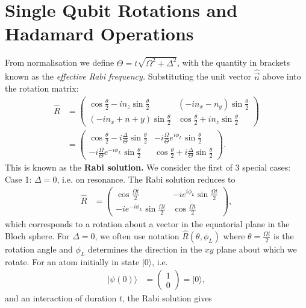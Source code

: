 \documentclass[a4paper, 11pt, normalem]{report}
\begin{document}
\chapter{Single Qubit Rotations and Hadamard Operations}
From normalisation we define $\Theta=t\sqrt{\Omega^2+\Delta^2}$, with the quantity in brackets known as the \emph{effective Rabi frequency.}
Substituting the unit vector $\hat{\vec{n}}$ above into the rotation matrix:
\begin{align}
    \hat{R} &= \begin{pmatrix} \cos\frac{\theta}{2}-in_z\sin\frac{\theta}{2} & (-in_x-n_y)\sin\frac{\theta}{2} \\ (-in_x+n+y)\sin\frac{\theta}{2} & \cos\frac{\theta}{2}+in_z\sin\frac{\theta}{2}\end{pmatrix} \\
            &= \begin{pmatrix} \cos\frac{\theta}{2}-i\frac{\Delta}{\Theta}\sin\frac{\theta}{2} & -i\frac{\Omega}{\Theta}e^{i\phi_L}\sin\frac{\theta}{2} \\ -i\frac{\Omega}{\Theta}e^{-i\phi_L}\sin\frac{\theta}{2} & \cos\frac{\theta}{2}+i\frac{\Delta}{\Theta}\sin\frac{\theta}{2}\end{pmatrix}.
\end{align}
This is known as the \textbf{Rabi solution.}
We consider the first of 3 special cases:\\
Case 1: $\Delta=0$, i.e. on resonance. The Rabi solution reduces to
\begin{align}
    \hat{R} &= \begin{pmatrix} \cos\frac{\Omega t}{2} & -ie^{i\phi_L}\sin\frac{\Omega t}{2} \\ -ie^{-i\phi_L}\sin\frac{\Omega t}{2} & \cos\frac{\Omega t}{2}\end{pmatrix},
\end{align}
which corresponds to a rotation about a vector in the equatorial plane in the Bloch sphere.
For $\Delta=0$, we often use notation $\hat{R}(\theta,\phi_L)$ where $\theta=\frac{\Omega t}{2}$ is the rotation angle and $\phi_L$ determines the direction in the $xy$ plane about which we rotate.
For an atom initially in state $|0\rangle$, i.e.
\begin{align}
    |\psi(0)\rangle &= \begin{pmatrix}1\\ 0\end{pmatrix} = |0\rangle,
\end{align}
and an interaction of duration $t$, the Rabi solution gives
\end{document}
